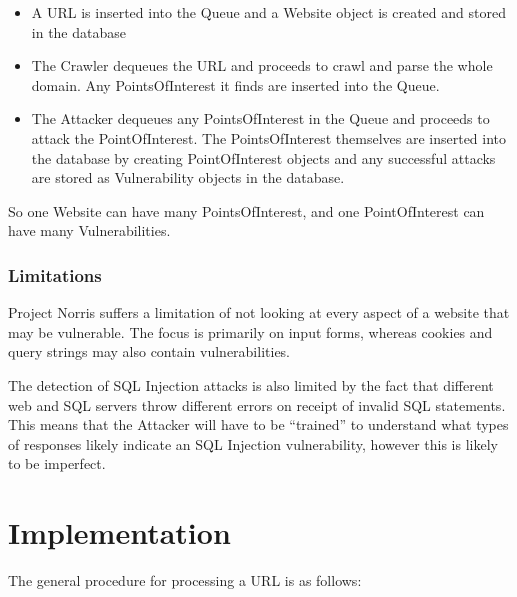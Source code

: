 \documentclass[12pt,a4paper]{article}
\begin{document}
\begin{itemize}
    \item A URL is inserted into the Queue and a Website object is created and stored in the database
    \item The Crawler dequeues the URL and proceeds to crawl and parse the whole domain.  Any PointsOfInterest it finds are inserted into the Queue.
    \item The Attacker dequeues any PointsOfInterest in the Queue and proceeds to attack the PointOfInterest.  The PointsOfInterest themselves are inserted into the database by creating PointOfInterest objects and any successful attacks are stored as Vulnerability objects in the database.
\end{itemize}

So one Website can have many PointsOfInterest, and one PointOfInterest can have many Vulnerabilities.

\subsubsection{Limitations}
Project Norris suffers a limitation of not looking at every aspect of a website that may be vulnerable.  The focus is primarily on input forms, whereas cookies and query strings may also contain vulnerabilities.

The detection of SQL Injection attacks is also limited by the fact that different web and SQL servers throw different errors on receipt of invalid SQL statements.  This means that the Attacker will have to be “trained” to understand what types of responses likely indicate an SQL Injection vulnerability, however this is likely to be imperfect.

\section{Implementation}
The general procedure for processing a URL is as follows:
\end{document}

